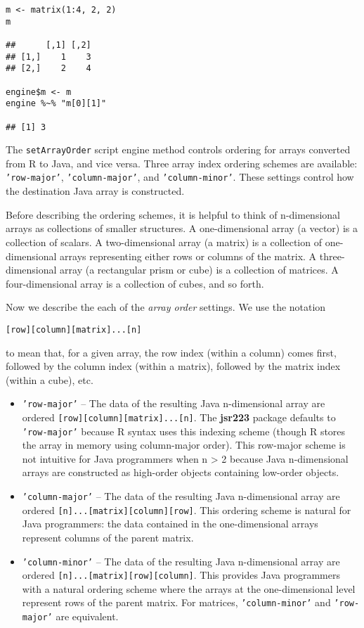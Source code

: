 \documentclass[
article,
11pt, %
a4paper, %
oneside, %
headinclude,footinclude, %
]{scrartcl}
\theoremstyle{definition} %
\theoremstyle{plain} %
\theoremstyle{remark} %
\newcommand{\pkg}[1]{\textbf{#1}}
\newcommand{\code}[1]{\texttt{#1}}
\begin{document}
\begin{verbatim}
m <- matrix(1:4, 2, 2)
m

##      [,1] [,2]
## [1,]    1    3
## [2,]    2    4

engine$m <- m
engine %~% "m[0][1]"

## [1] 3
\end{verbatim}

The \code{setArrayOrder} script engine method controls ordering for arrays converted from R to Java, and vice versa. Three array index ordering schemes are available: \code{'row-major'}, \code{'column-major'}, and \code{'column-minor'}. These settings control how the destination Java array is constructed.

Before describing the ordering schemes, it is helpful to think of n-dimensional arrays as collections of smaller structures. A one-dimensional array (a vector) is a collection of scalars. A two-dimensional array (a matrix) is a collection of one-dimensional arrays representing either rows or columns of the matrix. A three-dimensional array (a rectangular prism or cube) is a collection of matrices. A four-dimensional array is a collection of cubes, and so forth. 

Now we describe the each of the \textit{array order} settings. We use the notation
\begin{verbatim}
[row][column][matrix]...[n]
\end{verbatim}
to mean that, for a given array, the row index (within a column) comes first, followed by the column index (within a matrix), followed by the matrix index (within a cube), etc.

\begin{itemize}
\item \code{'row-major'} -- The data of the resulting Java n-dimensional array are ordered \newline \code{[row][column][matrix]...[n]}. The \pkg{jsr223} package defaults to \code{'row-major'} because R syntax uses this indexing scheme (though R stores the array in memory using column-major order). This row-major scheme is not intuitive for Java programmers when n > 2 because Java n-dimensional arrays are constructed as high-order objects containing low-order objects.

\item \code{'column-major'} -- The data of the resulting Java n-dimensional array are ordered \newline \code{[n]...[matrix][column][row]}. This ordering scheme is natural for Java programmers: the data contained in the one-dimensional arrays represent columns of the parent matrix.

\item \code{'column-minor'} -- The data of the resulting Java n-dimensional array are ordered \newline \code{[n]...[matrix][row][column]}. This provides Java programmers with a natural ordering scheme where the arrays at the one-dimensional level represent rows of the parent matrix. For matrices, \code{'column-minor'} and \code{'row-major'} are equivalent.

\end{itemize}
\end{document}
